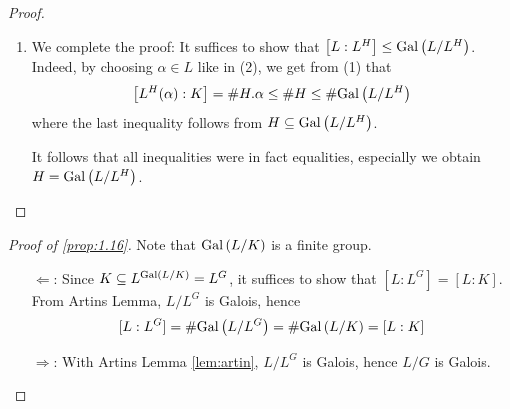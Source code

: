 \documentclass[twoside = false,	%
		headsepline,		%
		parskip = true,
		]{scrbook}						%
\begin{document}
\begin{proof}
\begin{enumerate}
                It suffices to show that $L\subseteq L^H(\alpha)$. For this fix an arbitrary $\beta\in L$ and consider the extension $L^H(\alpha,\beta)/L^H$. This extension is finite and separable (it is generated by separable elements). Now we can apply the primitive element theorem (Proposition 16(iii) in \cite{Cobra}), which gives $\gamma\in L$ with $K(\alpha)=K(\alpha,\beta)$. Because of the maximality property of $\alpha$, we have that $\gamma$ is already in $L^H(\alpha)$. The same must then be true for $\beta$. As a consequence, the extension $L/K$ is finite.
                \item We complete the proof: It suffices to show that $\left[ L:L^H\right]\leq\mathrm{Gal}\left( L/L^H\right)$. Indeed, by choosing $\alpha\in L$ like in (2), we get from (1) that
                 $$\left[ L^H(\alpha):K\right]=\#H.\alpha\leq \#H\leq \#\mathrm{Gal}\left( L/L^H\right)$$
                where the last inequality follows from $H\subseteq \mathrm{Gal}\left( L/L^H\right)$. 
                
                It follows that all inequalities were in fact equalities, especially we obtain $H=\mathrm{Gal}\left( L/L^H\right)$.
            \end{enumerate}
        \end{proof}
        \begin{proof}[Proof of \ref{prop:1.16}]
            Note that $\mathrm{Gal}\left( L/K\right)$ is a finite group.
            \begin{enumerate}
                \item [$\Leftarrow$:] Since $K\subseteq L^{\mathrm{Gal}\left( L/K\right)}=L^G$, it suffices to show that $[L:L^G]=[L:K]$. From Artins Lemma, $L/L^G$ is Galois, hence $$[L:L^G]=\#\mathrm{Gal}\left( L/L^G\right)=\#\mathrm{Gal}\left( L/K\right)=[L:K]$$
                \item [$\Rightarrow$:] With Artins Lemma \ref{lem:artin}, $L/L^G$ is Galois, hence $L/G$ is Galois.
            \end{enumerate}
        \end{proof}
\end{document}
